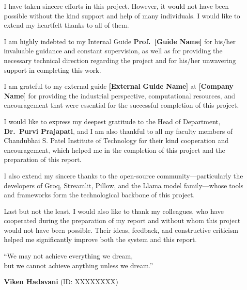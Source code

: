 I have taken sincere efforts in this project. However, it would not have been possible without the kind support and help of many individuals. I would like to extend my heartfelt thanks to all of them.

I am highly indebted to my Internal Guide \textbf{Prof.\ [Guide Name]} for his/her invaluable guidance and constant supervision, as well as for providing the necessary technical direction regarding the project and for his/her unwavering support in completing this work.

I am grateful to my external guide \textbf{[External Guide Name]} at \textbf{[Company Name]} for providing the industrial perspective, computational resources, and encouragement that were essential for the successful completion of this project.

I would like to express my deepest gratitude to the Head of Department, \textbf{Dr.\ Purvi Prajapati}, and I am also thankful to all my faculty members of Chandubhai S. Patel Institute of Technology for their kind cooperation and encouragement, which helped me in the completion of this project and the preparation of this report.

I also extend my sincere thanks to the open-source community---particularly the developers of Groq, Streamlit, Pillow, and the Llama model family---whose tools and frameworks form the technological backbone of this project.

Last but not the least, I would also like to thank my colleagues, who have cooperated during the preparation of my report and without whom this project would not have been possible. Their ideas, feedback, and constructive criticism helped me significantly improve both the system and this report.

\vspace{0.5cm}
\begin{flushright}
``We may not achieve everything we dream,\\but we cannot achieve anything unless we dream.''
\end{flushright}

\vspace{1.5cm}
\begin{flushright}
\textbf{Viken Hadavani} (ID: XXXXXXXX)
\end{flushright}
